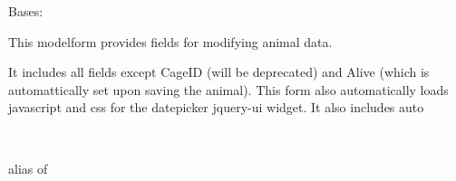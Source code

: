 \documentclass[letterpaper,10pt,english]{sphinxmanual}
\begin{document}
\begin{fulllineitems}
\label{api:animal.forms.AnimalForm}
Bases: 

This modelform provides fields for modifying animal data.

It includes all fields except CageID (will be deprecated) and Alive (which is automattically set upon saving the animal).
This form also automatically loads javascript and css for the datepicker jquery-ui widget.  It also includes auto

\begin{fulllineitems}
\label{api:animal.forms.AnimalForm.Media}
\end{fulllineitems}


\begin{fulllineitems}
\label{api:animal.forms.AnimalForm.Meta}~

\begin{fulllineitems}
\label{api:animal.forms.AnimalForm.Meta.model}
alias of 

\end{fulllineitems}


\end{fulllineitems}


\begin{fulllineitems}
\label{api:animal.forms.AnimalForm.media}
\end{fulllineitems}


\end{fulllineitems}

\end{document}
